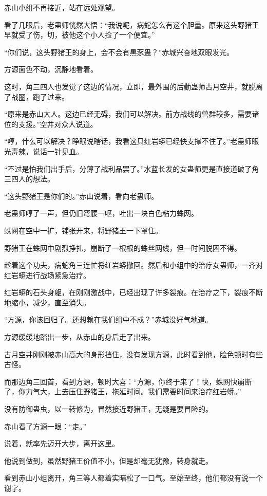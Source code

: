 \begin{this_body}
赤山小组不再接近，站在远处观望。

看了几眼后，老蛊师恍然大悟：“我说呢，病蛇怎么有这个胆量。原来这头野猪王早就受了伤，切，被他这个小人捡了一个便宜。”

“你们说，这头野猪王的身上，会不会有黒豕蛊？”赤城兴奋地双眼发光。

方源面色不动，沉静地看着。

这时，角三四人也发觉了这边的情况，立即，最外围的后勤蛊师古月空井，就脱离了战圈，跑了过来。

“原来是赤山大人。这边已经无碍，我们可以解决。前方战线的兽群较多，需要诸位的支援。”空井对众人说道。

“哼，什么可以解决？睁眼说瞎话，我看这只红岩蟒已经快支撑不住了。”老蛊师眼光毒辣，说话一针见血。

“不过是怕我们出手后，分薄了战利品罢了。”水蓝长发的女蛊师更是直接道破了角三四人的想法。

“这头野猪王是你们的。”赤山说着，看向老蛊师。

老蛊师哼了一声，但仍旧弯腰一呕，吐出一块白色粘力蛛网。

蛛网在空中一扩，铺张开来，将野猪王一下罩住。

野猪王在蛛网中剧烈挣扎，崩断了一根根的蛛丝网线，但一时间脱困不得。

趁着这个功夫，病蛇角三连忙将红岩蟒撤回。然后和小组中的治疗女蛊师，一齐对红岩蟒进行战场紧急治疗。

红岩蟒的石头身躯，在刚刚激战中，已经出现了许多裂痕。在治疗之下，裂痕不断地缩小，减少，直至消失。

“方源，你该回归了。还想赖在我们组中不成？”赤城没好气地道。

方源缓缓地踏出一步，从赤山的身后走了出来。

古月空井刚刚被赤山高大的身形挡住，没有发现方源，此时看到他，脸色顿时有些古怪。

而那边角三回首，看到方源，顿时大喜：“方源，你终于来了！快，蛛网快崩断了，你力气大，上去压住野猪王，拖延时间。我们需要时间来治疗红岩蟒。”

没有防御蛊虫，以一转修为，冒然接近野猪王，无疑是要冒险的。

赤山看了方源一眼：“走。”

说着，就率先迈开大步，离开这里。

他说到做到，虽然野猪王价值不小，但是却毫无犹豫，转身就走。

看到赤山小组离开，角三等人都着实暗松了一口气。至始至终，他们都没有说一个谢字。


\end{this_body}
